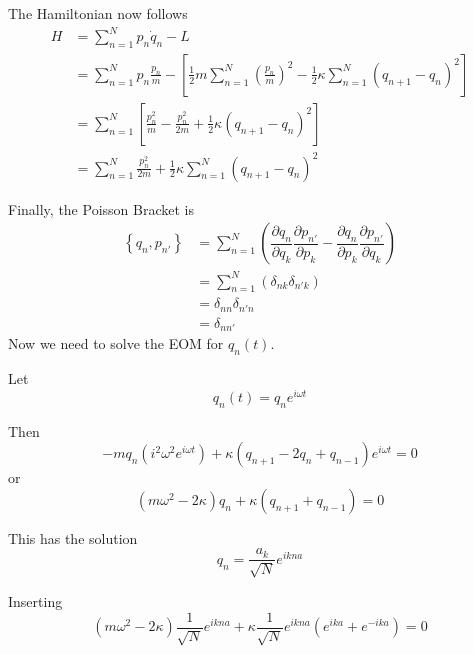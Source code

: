 \documentclass{article}
\begin{document}
\noindent The Hamiltonian now follows
\begin{align*}
    H &= \sum_{n=1}^N p_n \dot{q}_n - L \\
    &= \sum_{n=1}^N p_n \frac{p_n}{m} - \left[\frac{1}{2} m \sum_{n=1}^N {\left( \frac{p_n}{m} \right)}^2 - \tfrac{1}{2} \kappa \sum_{n=1}^N (q_{n+1} - q_n)^2 \right] \\
    &= \sum_{n=1}^N \left[ \frac{p_n^2}{m} - \frac{p_n^2}{2 m} + \tfrac{1}{2} \kappa (q_{n+1} - q_n)^2 \right] \\
    &= \sum_{n=1}^N \frac{p_n^2}{2 m} + \tfrac{1}{2} \kappa \sum_{n=1}^N (q_{n+1} - q_n)^2
\end{align*}


\noindent Finally, the Poisson Bracket is
\begin{align*}
    \left\lbrace q_n, p_{n'} \right\rbrace &= \sum_{n=1}^N \left( \dfrac{ \partial q_n }{ \partial q_k } \dfrac{ \partial p_{n'} }{ \partial p_k } - \dfrac{ \partial q_n }{ \partial p_k } \dfrac{ \partial p_{n'} }{ \partial q_k } \right) \\
    &= \sum_{n=1}^N \left( \delta_{nk} \delta_{n'k} \right) \\
    &= \delta_{nn} \delta_{n'n} \\
    &= \delta_{nn'}
\end{align*}
Now we need to solve the EOM for $q_n (t)$.

\noindent Let
\begin{equation*}
    q_n (t) = q_n e^{ i \omega t }
\end{equation*}

\noindent Then
\begin{equation*}
    -m q_n \left( i^2 \omega^2 e^{ i \omega t } \right) + \kappa \left( q_{n+1} - 2 q_n + q_{n-1} \right) e^{ i \omega t } = 0
\end{equation*}
or
\begin{equation*}
    \left( m \omega^2 - 2 \kappa \right) q_n + \kappa \left( q_{n+1} + q_{n-1} \right) = 0
\end{equation*}

\noindent This has the solution
\begin{equation*}
    q_n = \dfrac{ a_k }{ \sqrt{N} } e^{ i k n a }
\end{equation*}


\noindent Inserting
\begin{equation*}
    \left( m \omega^2 - 2 \kappa \right) \dfrac{1}{ \sqrt{N} } e^{ i k n a } + \kappa \dfrac{1}{ \sqrt{N} } e^{ i k n a } \left( e^{ i k a } + e^{ -i k a } \right) = 0
\end{equation*}
\end{document}
